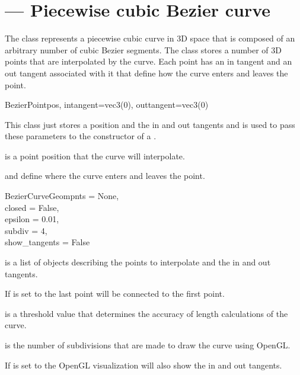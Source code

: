
\section{ ---
         Piecewise cubic Bezier curve}
\label{beziercurvegeom}

The  class represents a piecewise cubic curve
in 3D space that is composed of an arbitrary number of cubic Bezier
segments. The class stores a number of 3D points that are interpolated
by the curve. Each point has an in tangent and an out tangent associated
with it that define how the curve enters and leaves the point.

\begin{classdesc}{BezierPoint}{pos, intangent=vec3(0), outtangent=vec3(0)}

This class just stores a position and the in and out tangents and
is used to pass these parameters to the constructor of a 
.

 is a point position that the curve will interpolate.

 and  define where the curve enters
and leaves the point.
\end{classdesc}


\begin{classdesc}{BezierCurveGeom}{pnts = None,\\
                                   closed = False,\\
                                   epsilon = 0.01,\\
                                   subdiv = 4,\\
                                   show_tangents = False}

 is a list of  objects describing the
points to interpolate and the in and out tangents.

If  is set to  the last point will be connected
to the first point.

 is a threshold value that determines the accuracy of
length calculations of the curve.

 is the number of subdivisions that are made to draw the
curve using OpenGL.

If  is set to  the OpenGL visualization
will also show the in and out tangents.
\end{classdesc}

